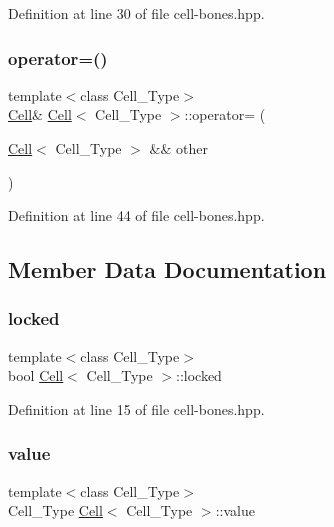 Definition at line 30 of file cell-\/bones.\+hpp.

\mbox{\label{class_cell_a9bb18ace78fd9010b461c853ccc2c0f7}} 
\subsubsection{\texorpdfstring{operator=()}{operator=()}\hspace{0.1cm}{\footnotesize\ttfamily [2/2]}}
{\footnotesize\ttfamily template$<$class Cell\+\_\+\+Type$>$ \\
\hyperlink{class_cell}{Cell}\& \hyperlink{class_cell}{Cell}$<$ Cell\+\_\+\+Type $>$\+::operator= (\begin{DoxyParamCaption}\item[{\hyperlink{class_cell}{Cell}$<$ Cell\+\_\+\+Type $>$ \&\&}]{other }\end{DoxyParamCaption})\hspace{0.3cm}{\ttfamily [inline]}}



Definition at line 44 of file cell-\/bones.\+hpp.



\subsection{Member Data Documentation}
\mbox{\label{class_cell_a8188629882a0c9acad81eff9f89e3d6e}} 
\subsubsection{\texorpdfstring{locked}{locked}}
{\footnotesize\ttfamily template$<$class Cell\+\_\+\+Type$>$ \\
bool \hyperlink{class_cell}{Cell}$<$ Cell\+\_\+\+Type $>$\+::locked}



Definition at line 15 of file cell-\/bones.\+hpp.

\mbox{\label{class_cell_a5df1609bc0705830ec4dc6e177ddc955}} 
\subsubsection{\texorpdfstring{value}{value}}
{\footnotesize\ttfamily template$<$class Cell\+\_\+\+Type$>$ \\
Cell\+\_\+\+Type \hyperlink{class_cell}{Cell}$<$ Cell\+\_\+\+Type $>$\+::value}



